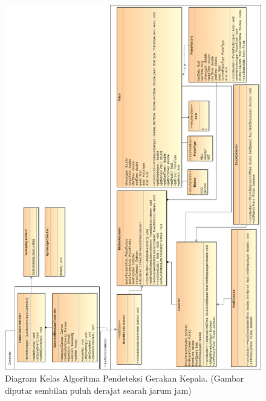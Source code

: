 \begin{figure}[htbp]
\centering
\includegraphics[scale=0.6]{Gambar/diagram-kelas-algoritma-pendeteksi-gerakan-kepala.png}
\caption{Diagram Kelas Algoritma Pendeteksi Gerakan Kepala. (Gambar diputar sembilan puluh derajat searah jarum jam)}
\label{fig:diagram-kelas-algoritma-pendeteksi-gerakan-kepala}
\end{figure}

